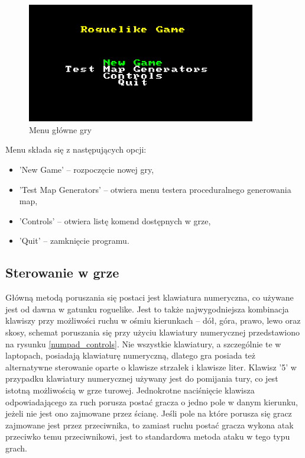 \documentclass[12pt,twoside]{article}
\begin{document}
\FloatBarrier
\begin{figure}[h]
	\centering
	\includegraphics[width=10cm]{images/mygame/scr1.png}
	\caption{Menu główne gry}
	\label{mygame:scr1}
\end{figure}
\FloatBarrier

Menu składa się z następujących opcji:
\begin{itemize}
	\item 'New Game' -- rozpoczęcie nowej gry,
	\item 'Test Map Generators' -- otwiera menu testera proceduralnego generowania map,			
	\item 'Controls' -- otwiera listę komend dostępnych w grze,
	\item 'Quit' -- zamknięcie programu.
\end{itemize}


\subsection{Sterowanie w grze}
 Główną metodą poruszania się postaci jest klawiatura numeryczna, co używane jest od dawna w gatunku roguelike. Jest to także najwygodniejsza kombinacja klawiszy przy możliwości ruchu w ośmiu kierunkach -- dół, góra, prawo, lewo oraz skosy, schemat poruszania się przy użyciu klawiatury numerycznej przedstawiono na rysunku \ref{numpad_controls}. Nie wszystkie klawiatury, a szczególnie te w laptopach, posiadają klawiaturę numeryczną, dlatego gra posiada też alternatywne sterowanie oparte o klawisze strzałek i klawisze liter. Klawisz '5' w przypadku klawiatury numerycznej używany jest do pomijania tury, co jest istotną możliwością w grze turowej. Jednokrotne naciśnięcie klawisza odpowiadającego za ruch porusza postać gracza o jedno pole w danym kierunku, jeżeli nie jest ono zajmowane przez ścianę. Jeśli pole na które porusza się gracz zajmowane jest przez przeciwnika, to zamiast ruchu postać gracza wykona atak przeciwko temu przeciwnikowi, jest to standardowa metoda ataku w tego typu grach.
 
\end{document}
